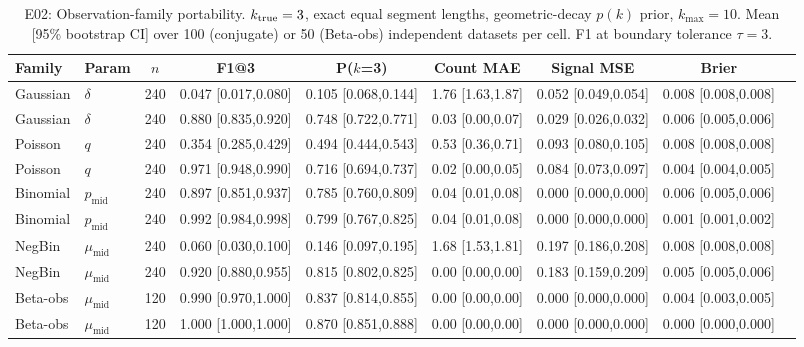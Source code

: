 \begin{table}[!htbp]
\centering
\footnotesize
\caption{E02: Observation-family portability. $k_{\rm true}=3$, exact equal segment lengths, geometric-decay $p(k)$ prior, $k_{\max}=10$. Mean [95\% bootstrap CI] over 100 (conjugate) or 50 (Beta-obs) independent datasets per cell. F1 at boundary tolerance $\tau=3$.}
\label{tab:E02-recovery-paper}
\begin{tabular}{llccccccc}
\toprule
Family & Param & $n$ & F1@3 & P($k$=3) & Count MAE & Signal MSE & Brier \\
\midrule
Gaussian & $\delta$ & 240 & 0.047 [0.017,0.080] & 0.105 [0.068,0.144] & 1.76 [1.63,1.87] & 0.052 [0.049,0.054] & 0.008 [0.008,0.008] \\
Gaussian & $\delta$ & 240 & 0.880 [0.835,0.920] & 0.748 [0.722,0.771] & 0.03 [0.00,0.07] & 0.029 [0.026,0.032] & 0.006 [0.005,0.006] \\
\midrule
Poisson & $q$ & 240 & 0.354 [0.285,0.429] & 0.494 [0.444,0.543] & 0.53 [0.36,0.71] & 0.093 [0.080,0.105] & 0.008 [0.008,0.008] \\
Poisson & $q$ & 240 & 0.971 [0.948,0.990] & 0.716 [0.694,0.737] & 0.02 [0.00,0.05] & 0.084 [0.073,0.097] & 0.004 [0.004,0.005] \\
\midrule
Binomial & $p_{\mathrm{mid}}$ & 240 & 0.897 [0.851,0.937] & 0.785 [0.760,0.809] & 0.04 [0.01,0.08] & 0.000 [0.000,0.000] & 0.006 [0.005,0.006] \\
Binomial & $p_{\mathrm{mid}}$ & 240 & 0.992 [0.984,0.998] & 0.799 [0.767,0.825] & 0.04 [0.01,0.08] & 0.000 [0.000,0.000] & 0.001 [0.001,0.002] \\
\midrule
NegBin & $\mu_{\mathrm{mid}}$ & 240 & 0.060 [0.030,0.100] & 0.146 [0.097,0.195] & 1.68 [1.53,1.81] & 0.197 [0.186,0.208] & 0.008 [0.008,0.008] \\
NegBin & $\mu_{\mathrm{mid}}$ & 240 & 0.920 [0.880,0.955] & 0.815 [0.802,0.825] & 0.00 [0.00,0.00] & 0.183 [0.159,0.209] & 0.005 [0.005,0.006] \\
\midrule
Beta-obs & $\mu_{\mathrm{mid}}$ & 120 & 0.990 [0.970,1.000] & 0.837 [0.814,0.855] & 0.00 [0.00,0.00] & 0.000 [0.000,0.000] & 0.004 [0.003,0.005] \\
Beta-obs & $\mu_{\mathrm{mid}}$ & 120 & 1.000 [1.000,1.000] & 0.870 [0.851,0.888] & 0.00 [0.00,0.00] & 0.000 [0.000,0.000] & 0.000 [0.000,0.000] \\
\bottomrule
\end{tabular}
\end{table}
